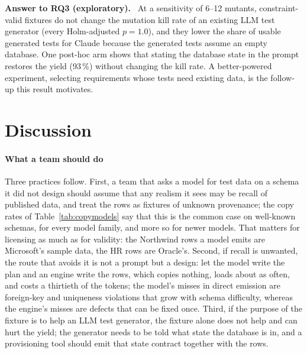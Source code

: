 \documentclass[preprint,12pt]{elsarticle}
\newenvironment{answer}[1]{\begin{framed}\noindent\textbf{#1.}\ }{\end{framed}}
\begin{document}
\begin{answer}{Answer to RQ3 (exploratory)}
At a sensitivity of 6--12 mutants, constraint-valid fixtures do not change the mutation kill rate of an existing LLM test generator (every Holm-adjusted $p=1.0$), and they lower the share of usable generated tests for Claude because the generated tests assume an empty database. One post-hoc arm shows that stating the database state in the prompt restores the yield (93\,\%) without changing the kill rate. A better-powered experiment, selecting requirements whose tests need existing data, is the follow-up this result motivates.
\end{answer}

\section{Discussion}
\label{sec:discussion}
\paragraph{What a team should do} Three practices follow. First, a team that asks a model for test data on a schema it did not design should assume that any realism it sees may be recall of published data, and treat the rows as fixtures of unknown provenance; the copy rates of Table~\ref{tab:copymodels} say that this is the common case on well-known schemas, for every model family, and more so for newer models. That matters for licensing as much as for validity: the Northwind rows a model emits are Microsoft's sample data, the HR rows are Oracle's. Second, if recall is unwanted, the route that avoids it is not a prompt but a design: let the model write the plan and an engine write the rows, which copies nothing, loads about as often, and costs a thirtieth of the tokens; the model's misses in direct emission are foreign-key and uniqueness violations that grow with schema difficulty, whereas the engine's misses are defects that can be fixed once. Third, if the purpose of the fixture is to help an LLM test generator, the fixture alone does not help and can hurt the yield; the generator needs to be told what state the database is in, and a provisioning tool should emit that state contract together with the rows.
\end{document}
